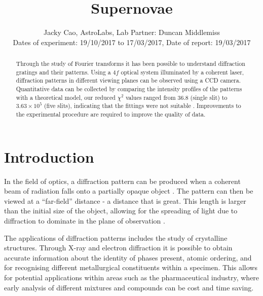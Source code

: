 \documentclass[twocolumn]{revtex4}
\begin{document}
\textheight=26.385cm

\title{Supernovae}
 
\author{Jacky Cao, AstroLabs, Lab Partner: Duncan Middlemiss \\ Dates of experiment: 19/10/2017 to 17/03/2017, Date of report: 19/03/2017}

\begin{abstract}              
Through the study of Fourier transforms it has been possible to understand diffraction gratings and their patterns. Using a $4f$ optical system illuminated by a coherent laser, diffraction patterns in different viewing planes can be observed using a CCD camera. Quantitative data can be collected by comparing the intensity profiles of the patterns with a theoretical model, our reduced $\chi^2$ values ranged from 36.8 (single slit) to $3.63\times10^5$ (five slits), indicating that the fittings were not suitable \cite{hughesandhayes}. Improvements to the experimental procedure are required to improve the quality of data. 
\end{abstract}

\maketitle

\section{Introduction} 
\vspace{-2ex} 

In the field of optics, a diffraction pattern can be produced when a coherent beam of radiation falls onto a partially opaque object \cite{mathmethods}. The pattern can then be viewed at a ``far-field'' distance - a distance that is great. This length is larger than the initial size of the object, allowing for the spreading of light due to diffraction to dominate in the  plane of observation \cite{of2f}. 

The applications of diffraction patterns includes the study of crystalline structures. Through X-ray and electron diffraction it is possible to obtain accurate information about the identity of phases present, atomic ordering, and for recognising different metallurgical constituents within a specimen. This allows for potential applications within areas such as the pharmaceutical industry, where early analysis of different mixtures and compounds can be cost and time saving. \cite{elecdiffraction, xraypharma}
\end{document}
